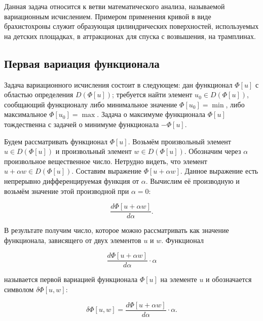 \begin{info}
	Данная задача относится к ветви математического анализа, называемой вариационным исчислением. Примером применения кривой в виде брахистохроны служит образующая цилиндрических поверхностей, используемых на детских площадках, в аттракционах для спуска с возвышения, на трамплинах.
\end{info}


\subsection{Первая вариация функционала}

Задача вариационного исчисления состоит в следующем: дан функционал $\Phi[u]$ с областью определения $D(\Phi[u])$; требуется найти элемент $u_{0} \in D(\Phi[u])$,
 сообщающий функционалу либо минимальное значение $\Phi[u_{0}] = \min$, либо максимальное $\Phi[u_{0}] = \max$. 
 Задача о максимуме функционала $\Phi[u]$ тождественна с задачей о минимуме функционала $- \Phi[u]$.

Будем рассматривать функционал $\Phi[u]$. Возьмём произвольный элемент $u \in D(\Phi[u])$ и произвольный элемент $w \in D(\Phi[u]) $.
 Обозначим через $\alpha$ произвольное вещественное число. Нетрудно видеть, что элемент $ u + \alpha w \in D(\Phi[u])$. 
 Составим выражение $\Phi[u + \alpha w]$. Данное выражение есть непрерывно дифференцируемая функция от $\alpha$. 
 Вычислим её производную и возьмём значение этой производной при $\alpha = 0$:

\begin{displaymath}
    \frac{d\Phi[u + \alpha w]}{d\alpha}.
\end{displaymath}

\noindent В результате получим число, которое можно рассматривать как значение функционала, зависящего от двух элементов $u$ и $w$. Функционал

\begin{displaymath}
    \frac{d\Phi[u + \alpha w]}{d\alpha} \cdot \alpha
\end{displaymath}

\noindent называется первой вариацией функционала $\Phi[u]$ на элементе $u$ и обозначается символом $\delta \Phi[u, w]$:

\begin{displaymath}
     \delta \Phi[u, w] = \frac{d\Phi[u + \alpha w]}{d\alpha} \cdot \alpha.
\end{displaymath}

